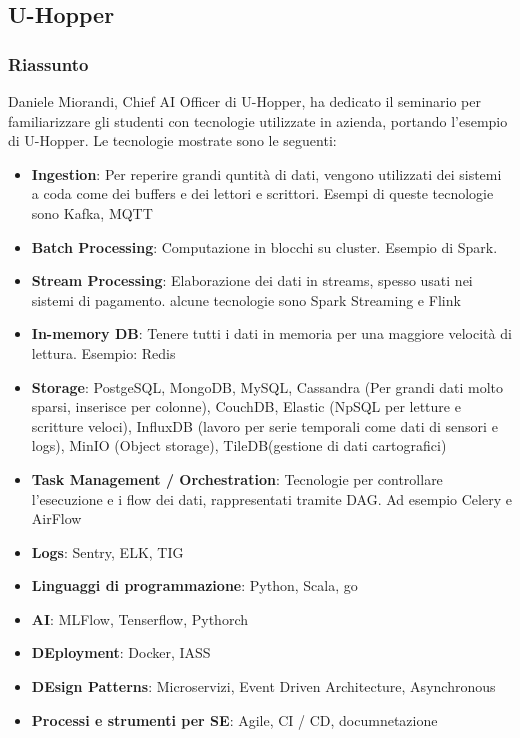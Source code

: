 \documentclass{report}
\begin{document}
\subsection{U-Hopper}

\subsubsection*{Riassunto}

Daniele Miorandi, Chief AI Officer  di U-Hopper, ha dedicato il seminario per familiarizzare gli studenti con tecnologie utilizzate in azienda, portando l'esempio di U-Hopper. Le tecnologie mostrate sono le seguenti:
\begin{itemize}
	\item \textbf{Ingestion}: Per reperire grandi quntità di dati, vengono utilizzati dei sistemi a coda come dei buffers e dei lettori e scrittori. Esempi di queste tecnologie sono Kafka, MQTT
	\item \textbf{Batch Processing}: Computazione in blocchi su cluster. Esempio di Spark.
	\item \textbf{Stream Processing}: Elaborazione dei dati in streams, spesso usati nei sistemi di pagamento. alcune tecnologie sono Spark Streaming e Flink
	\item \textbf{In-memory DB}: Tenere tutti i dati in memoria per una maggiore velocità di lettura. Esempio: Redis
	\item \textbf{Storage}: PostgeSQL, MongoDB, MySQL, Cassandra (Per grandi dati molto sparsi, inserisce per colonne), CouchDB, Elastic (NpSQL per letture e scritture veloci), InfluxDB (lavoro per serie temporali come dati di sensori e logs), MinIO (Object storage), TileDB(gestione di dati cartografici)
	\item \textbf{Task Management / Orchestration}: Tecnologie per controllare l'esecuzione e i flow dei dati, rappresentati tramite DAG. Ad esempio Celery e AirFlow
	\item \textbf{Logs}: Sentry, ELK, TIG
	\item \textbf{Linguaggi di programmazione}: Python, Scala, go
	\item \textbf{AI}: MLFlow, Tenserflow, Pythorch
	\item \textbf{DEployment}: Docker, IASS
	\item \textbf{DEsign Patterns}: Microservizi, Event Driven Architecture, Asynchronous
	\item \textbf{Processi e strumenti per SE}: Agile, CI / CD, documnetazione
\end{itemize}
\end{document}
